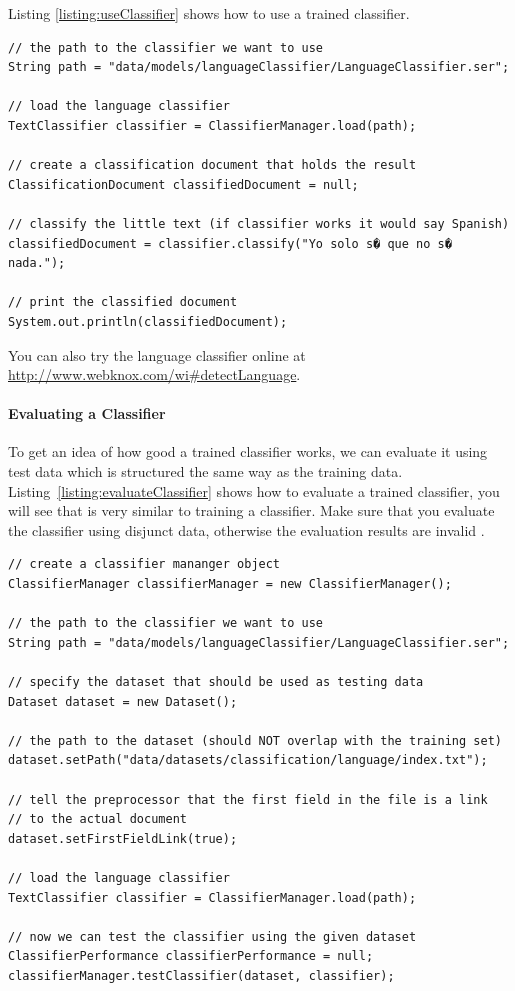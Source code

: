 Listing \ref{listing:useClassifier} shows how to use a trained classifier.

\begin{codelisting}
\begin{lstlisting}[label=listing:useClassifier,caption=Use a trained text classifier.,frame=tb]
// the path to the classifier we want to use
String path = "data/models/languageClassifier/LanguageClassifier.ser";

// load the language classifier
TextClassifier classifier = ClassifierManager.load(path);

// create a classification document that holds the result
ClassificationDocument classifiedDocument = null;

// classify the little text (if classifier works it would say Spanish)
classifiedDocument = classifier.classify("Yo solo s� que no s� nada.");

// print the classified document
System.out.println(classifiedDocument);
\end{lstlisting}
\end{codelisting}

You can also try the language classifier online at \url{http://www.webknox.com/wi#detectLanguage}.

\paragraph{Evaluating a Classifier}
To get an idea of how good a trained classifier works, we can evaluate it using test data which is structured the same way as the training data. Listing~\ref{listing:evaluateClassifier} shows how to evaluate a trained classifier, you will see that is very similar to training a classifier. Make sure that you evaluate the classifier using disjunct data, otherwise the evaluation results are invalid .

\begin{codelisting}
\begin{lstlisting}[label=listing:evaluateClassifier,caption=Evaluating a trained text classifier.,frame=tb]
// create a classifier mananger object
ClassifierManager classifierManager = new ClassifierManager();

// the path to the classifier we want to use
String path = "data/models/languageClassifier/LanguageClassifier.ser";

// specify the dataset that should be used as testing data
Dataset dataset = new Dataset();

// the path to the dataset (should NOT overlap with the training set)
dataset.setPath("data/datasets/classification/language/index.txt");

// tell the preprocessor that the first field in the file is a link
// to the actual document
dataset.setFirstFieldLink(true);

// load the language classifier
TextClassifier classifier = ClassifierManager.load(path);

// now we can test the classifier using the given dataset
ClassifierPerformance classifierPerformance = null;
classifierManager.testClassifier(dataset, classifier);
\end{lstlisting}
\end{codelisting}

